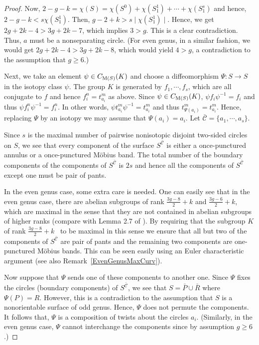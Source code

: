 \documentclass[11 pt]{amsart}
\theoremstyle{definition}
\begin{document}
\begin{proof}
Now, $2-g-k = \chi(S)= \chi(S^{0}) + \chi(S_{1}^{1}) + \cdots +
\chi(S_{1}^s)$ and hence, $2-g-k < s \chi(S_{1}^{1})$. Then, $g-2+k
> s \mid \chi(S_{1}^{1}) \mid$. Hence, we get $2g+2k-4 >
3g+2k-7$, which implies $3 > g$. This is a clear contradiction.
Thus, $a$ must be a nonseparating circle. (For even genus, in a
similar fashion, we would get $2g+2k-4 > 3g+2k-8$, which would yield
$4 > g$, a contradiction to the assumption that $g\geq 6$.)

Next, we take an element $\psi \in C_{{\rm M}(S)}(K)$ and choose a
diffeomorphism $\Psi : S \to S$ in the isotopy class $\psi$. The
group $K$ is generated by $f_{1}, \cdots, f_s$, which are all
conjugate to $f$ and hence $f^n_{i} = t_{a_{i}}^m$ as above. Since
$\psi \in C_{{\rm M}(S)}(K)$, $\psi f_{i} \psi^{-1} = f_{i}$ and
thus $\psi f_{i}^{n} \psi^{-1} = f_{i}^{n}$. In other words, $\psi
t_{a_{i}}^m \psi^{-1} = t_{a_{i}}^m$ and thus $t_{\Psi(a_{i})}^m =
t_{a_{i}}^m$. Hence, replacing $\Psi$ by an isotopy we may assume
that $\Psi(a_{i})=a_{i}$. Let $\mathcal{\bar{C}} = \{a_{1}, \cdots,
a_s \}$.

Since $s$ is the maximal number of pairwise nonisotopic disjoint
two-sided circles on $S$, we see that every component of the surface
$S^{\mathcal{\bar{C}}}$ is either a once-punctured annulus or a
once-punctured M\"obius band. The total number of the boundary
components of the components of $S^{\mathcal{\bar{C}}}$ is $2s$ and
hence all the components of $S^{\mathcal{\bar{C}}}$ except one must
be pair of pants.

In the even genus case, some extra care is needed. One can easily
see that in the even genus case, there are abelian subgroups of rank
$\displaystyle\frac{3g-8}{2} + k$ and $\displaystyle\frac{3g-6}{2} +
k$, which are maximal in the sense that they are not contained in
abelian subgroups of higher ranks (compare with Lemma 2.7 of
\cite{A}). By requiring that the subgroup $K$ of rank
$\displaystyle\frac{3g-8}{2} + k$ \ to be maximal in this sense we
ensure that all but two of the components of $S^{\mathcal{\bar{C}}}$
are pair of pants and the remaining two components are one-punctured
M\"obius bands. This can be seen easily using an Euler
characteristic argument (see also Remark~\ref{EvenGenusMaxCurv}).

Now suppose that $\Psi$ sends one of these components to another
one. Since $\Psi$ fixes the circles (boundary components) of
$S^\mathcal{\bar{C}}$, we see that $S= \bar P \cup \bar R$ where
$\Psi(P)=R$. However, this is a contradiction to the assumption that
$S$ is a nonorientable surface of odd genus. Hence, $\Psi$ does not
permute the components. It follows that, $\Psi$ is a composition of
twists about the circles $a_{i}$. (Similarly, in the even genus
case, $\Psi$ cannot interchange the components since by assumption
$g\geq 6$.)


\end{proof}
\end{document}
